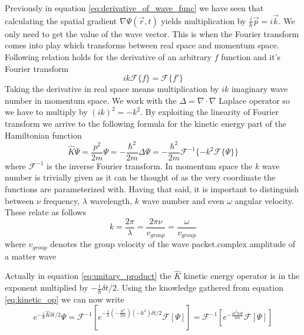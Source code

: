 Previously in equation \ref{eq:derivative_of_wave_func} we have seen that calculating the spatial gradient $\nabla \Psi(\vec{r}, t)$ yields multiplication by $\frac{i}{\hbar}\vec{p} = i\vec{k}$.
We only need to get the value of the wave vector.
This is when the Fourier transform comes into play which transforms between real space and momentum space.
Following relation holds for the derivative of an arbitrary $f$ function and it's Fourier transform
\begin{equation}
	ik\mathcal{F}\{f\} = \mathcal{F}\{f'\}
\end{equation}
Taking the derivative in real space means multiplication by $ik$ imaginary wave number in momentum space.
We work with the $\Delta = \nabla \cdot \nabla$ Laplace operator so we have to multiply by $(ik)^2 = -k^2$.
By exploiting the linearity of Fourier transform we arrive to the following formula for the kinetic energy part of the Hamiltonian function
\begin{equation}
	\label{eq:kinetic_op}
	\hat{K} \Psi = \frac{p^2}{2m}\Psi = -\frac{\hbar^2}{2m} \Delta \Psi = -\frac{\hbar^2}{2m}\mathcal{F}^{-1}
	\{
		-k^2\mathcal{F}\{\Psi\}
	\}
\end{equation}
where $\mathcal{F}^{-1}$ is the inverse Fourier transform. In momentum space the $k$ wave number is trivially given as it can be thought of as the very coordinate the functions are parameterized with.
Having that said, it is important to distinguish between $\nu$ frequency, $\lambda$ wavelength, $k$ wave number and even $\omega$ angular velocity.
These relate as follows
\begin{equation}
	\label{eq:relation_of_dimensions}
	k = \frac{2\pi}{\lambda} = \frac{2\pi\nu}{v_{group}} = \frac{\omega}{v_{group}}
\end{equation}
where $v_{group}$ denotes the group velocity of the wave packet.complex amplitude of a matter wave 

Actually in equation \ref{eq:unitary_product} the $\hat{K}$ kinetic energy operator is in the exponent multiplied by $-\frac{i}{\hbar}\delta t / 2$.
Using the knowledge gathered from equation \ref{eq:kinetic_op} we can now write
\begin{equation}
	\label{eq:kinetic_prop}
	e^{-\frac{i}{\hbar}\hat{K}\delta t / 2}\Psi = \mathcal{F}^{-1}
	\left[
		e^{-\frac{i}{\hbar} \left(-\frac{\hbar^2}{2m}\right) \left(-k^2\right) \delta t / 2} \mathcal{F}\left[ \Psi \right]
	\right] = 
	\mathcal{F}^{-1}
	\left[
	e^{-\frac{i k^2 \hbar \delta t}{4m}} \mathcal{F}\left[ \Psi \right]
	\right]
\end{equation}

